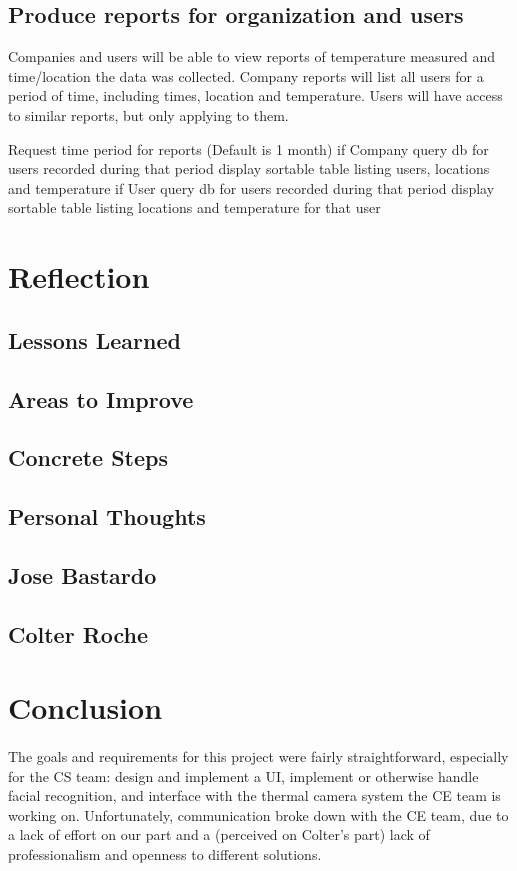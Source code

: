 \documentclass[12pt, letterpaper]{article}
\begin{document}
    \subsection{Produce reports for organization and users}
    Companies and users will be able to view reports of temperature measured and time/location the data was collected.
    Company reports will list all users for a period of time, including times, location and temperature.  Users will have
    access to similar reports, but only applying to them.
    \begin{algorithm}
        Request time period for reports (Default is 1 month)
        if Company
            query db for users recorded during that period
            display sortable table listing users, locations and temperature
        if User
            query db for users recorded during that period
            display sortable table listing locations and temperature for that user
    \end{algorithm}
    \section{Reflection}
    \subsection{Lessons Learned}
    \subsection{Areas to Improve}
    \subsection{Concrete Steps}
    \subsection{Personal Thoughts}
    \subsection{Jose Bastardo}
    \subsection{Colter Roche}
    \section{Conclusion}
    \paragraph{}
    The goals and requirements for this project were fairly straightforward, especially for the 
    CS team: design and implement a UI, implement or otherwise handle facial recognition, and 
    interface with the thermal camera system the CE team is working on.  Unfortunately, 
    communication broke down with the CE team, due to a lack of effort on our part and a 
    (perceived on Colter’s part) lack of professionalism and openness to different solutions.  
\end{document}
